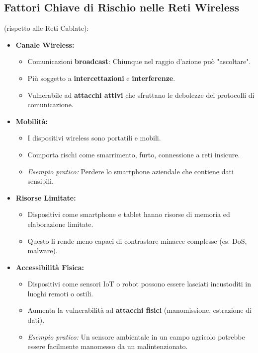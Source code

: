 \subsection{Fattori Chiave di Rischio nelle Reti Wireless}
(rispetto alle Reti Cablate):
\begin{itemize}
    \item \textbf{Canale Wireless:}
    \begin{itemize}
        \item Comunicazioni \textbf{broadcast}: Chiunque nel raggio d'azione può "ascoltare".
        \item Più soggetto a \textbf{intercettazioni} e \textbf{interferenze}.
        \item Vulnerabile ad \textbf{attacchi attivi} che sfruttano le debolezze dei protocolli di comunicazione.
    \end{itemize}
    \item \textbf{Mobilità:}
    \begin{itemize}
        \item I dispositivi wireless sono portatili e mobili.
        \item Comporta rischi come smarrimento, furto, connessione a reti insicure.
        \item \textit{Esempio pratico:} Perdere lo smartphone aziendale che contiene dati sensibili.
    \end{itemize}
    \item \textbf{Risorse Limitate:}
    \begin{itemize}
        \item Dispositivi come smartphone e tablet hanno risorse di memoria ed elaborazione limitate.
        \item Questo li rende meno capaci di contrastare minacce complesse (es. DoS, malware).
    \end{itemize}
    \item \textbf{Accessibilità Fisica:}
    \begin{itemize}
        \item Dispositivi come sensori IoT o robot possono essere lasciati incustoditi in luoghi remoti o ostili.
        \item Aumenta la vulnerabilità ad \textbf{attacchi fisici} (manomissione, estrazione di dati).
        \item \textit{Esempio pratico:} Un sensore ambientale in un campo agricolo potrebbe essere facilmente manomesso da un malintenzionato.
    \end{itemize}
\end{itemize}

